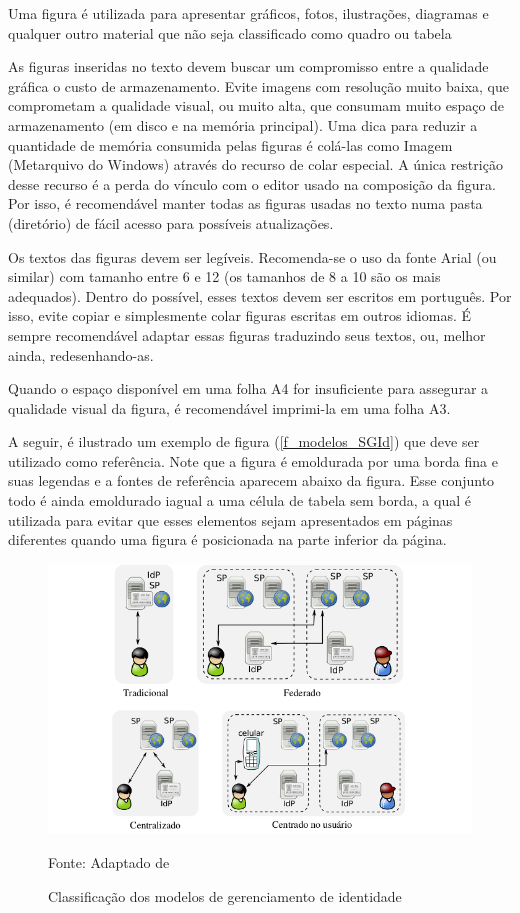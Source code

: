 Uma figura é utilizada para apresentar gráficos, fotos, ilustrações, diagramas e qualquer outro material que não seja classificado como quadro ou tabela %

As figuras inseridas no texto devem buscar um compromisso entre a qualidade gráfica o custo de armazenamento. Evite imagens com resolução muito baixa, que comprometam a qualidade visual, ou muito alta, que consumam muito espaço de armazenamento (em disco e na memória principal). Uma dica para reduzir a quantidade de memória consumida pelas figuras é colá-las como Imagem (Metarquivo do Windows) através do recurso de colar especial. A única restrição desse recurso é a perda do vínculo com o editor usado na composição da figura. Por isso, é recomendável manter todas as figuras usadas no texto numa pasta (diretório) de fácil acesso para possíveis atualizações.

Os textos das figuras devem ser legíveis. Recomenda-se o uso da fonte Arial (ou similar) com tamanho entre 6 e 12 (os tamanhos de 8 a 10 são os mais adequados). Dentro do possível, esses textos devem ser escritos em português. Por isso, evite copiar e simplesmente colar figuras escritas em outros idiomas. É sempre recomendável adaptar essas figuras traduzindo seus textos, ou, melhor ainda, redesenhando-as.

Quando o espaço disponível em uma folha A4 for insuficiente para assegurar a qualidade visual da figura, é recomendável imprimi-la em uma folha A3.

A seguir, é ilustrado um exemplo de figura (\autoref{f_modelos_SGId}) que deve ser utilizado como referência. Note que a figura é emoldurada por uma borda fina e suas legendas e a fontes de referência aparecem abaixo da figura. Esse conjunto todo é ainda emoldurado iagual a uma célula de tabela sem borda, a qual é utilizada para evitar que esses elementos sejam apresentados em páginas diferentes quando uma figura é posicionada na parte inferior da página. 


\begin{figure}[!htpb]
  \centering
  \includegraphics[width=.89\linewidth,fbox]{figs/Modelos_SGId.png}
  \caption{Classificação dos modelos de gerenciamento de identidade}
  \raggedright Fonte: Adaptado de %
  \label{f_modelos_SGId}
\end{figure}



